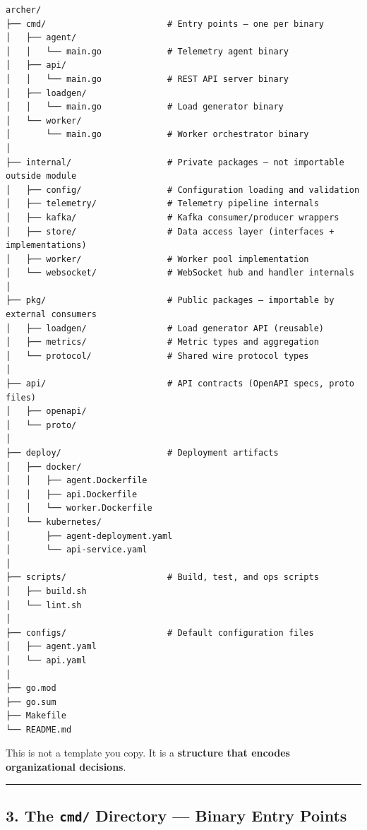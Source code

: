 \documentclass[
]{article}
\begin{document}
\begin{verbatim}
archer/
├── cmd/                        # Entry points — one per binary
│   ├── agent/
│   │   └── main.go             # Telemetry agent binary
│   ├── api/
│   │   └── main.go             # REST API server binary
│   ├── loadgen/
│   │   └── main.go             # Load generator binary
│   └── worker/
│       └── main.go             # Worker orchestrator binary
│
├── internal/                   # Private packages — not importable outside module
│   ├── config/                 # Configuration loading and validation
│   ├── telemetry/              # Telemetry pipeline internals
│   ├── kafka/                  # Kafka consumer/producer wrappers
│   ├── store/                  # Data access layer (interfaces + implementations)
│   ├── worker/                 # Worker pool implementation
│   └── websocket/              # WebSocket hub and handler internals
│
├── pkg/                        # Public packages — importable by external consumers
│   ├── loadgen/                # Load generator API (reusable)
│   ├── metrics/                # Metric types and aggregation
│   └── protocol/               # Shared wire protocol types
│
├── api/                        # API contracts (OpenAPI specs, proto files)
│   ├── openapi/
│   └── proto/
│
├── deploy/                     # Deployment artifacts
│   ├── docker/
│   │   ├── agent.Dockerfile
│   │   ├── api.Dockerfile
│   │   └── worker.Dockerfile
│   └── kubernetes/
│       ├── agent-deployment.yaml
│       └── api-service.yaml
│
├── scripts/                    # Build, test, and ops scripts
│   ├── build.sh
│   └── lint.sh
│
├── configs/                    # Default configuration files
│   ├── agent.yaml
│   └── api.yaml
│
├── go.mod
├── go.sum
├── Makefile
└── README.md
\end{verbatim}

This is not a template you copy. It is a \textbf{structure that encodes
organizational decisions}.

\begin{center}\rule{0.5\linewidth}{0.5pt}\end{center}

\hypertarget{the-cmd-directory-binary-entry-points}{%
\subsection{\texorpdfstring{3. The \texttt{cmd/} Directory --- Binary
Entry
Points}{3. The cmd/ Directory --- Binary Entry Points}}\label{the-cmd-directory-binary-entry-points}}
\end{document}
